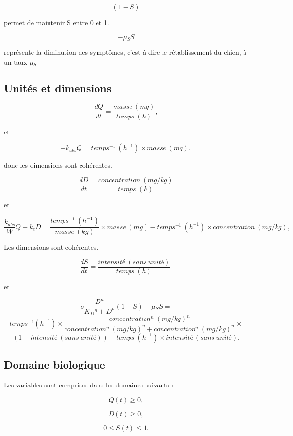 \documentclass[11pt,a4paper]{article}
\begin{document}
\[
(1-S)
\]

permet de maintenir S entre 0 et 1. 

\[
-\mu{_S}S
\]

représente la diminution des symptômes, c'est-à-dire le rétablissement du chien, à un taux
$\mu{_S}$

\subsection{Unités et dimensions}

\[
\frac{dQ}{dt}=\frac{masse~(mg)}{temps~(h)},
\]

et

\[
-k{_{abs}}Q=temps^{-1}~(h^{-1}) \times masse~(mg),
\]

donc les dimensions sont cohérentes. 

\[
\frac{dD}{dt}=\frac{concentration~(mg/kg)}{temps~(h)}
\]

et 

\[
\frac{k{_{abs}}}{W}Q-k{_{e}}D=\frac{temps^{-1}~(h^{-1})}{masse~(kg)} \times masse~(mg)-temps^{-1}~(h^{-1})
\times concentration~(mg/kg),
\]

Les dimensions sont cohérentes.

\[
\frac{dS}{dt}=\frac{intensité~(sans~unité)}{temps~(h)}.
\]

et

\[
\rho\frac{D^n}{K{_D}^n + D^n}(1-S)-\mu{_S}S=
\]
\[
temps^{-1} (h^{-1}) \times \frac{concentration^n~(mg/kg)^n}
{concentration^n~(mg/kg)^n + concentration^n~(mg/kg)^n}\times
\]
\[
(1-intensité~(sans~unité))-temps~(h^{-1})\times 
intensité~(sans~unité).
\]

\subsection{Domaine biologique}

Les variables sont comprises dans les domaines suivants :

\[
Q(t)\geq 0,
\]

\[
D(t)\geq 0,
\]

\[
0\leq S(t)\leq 1.
\]
\end{document}
